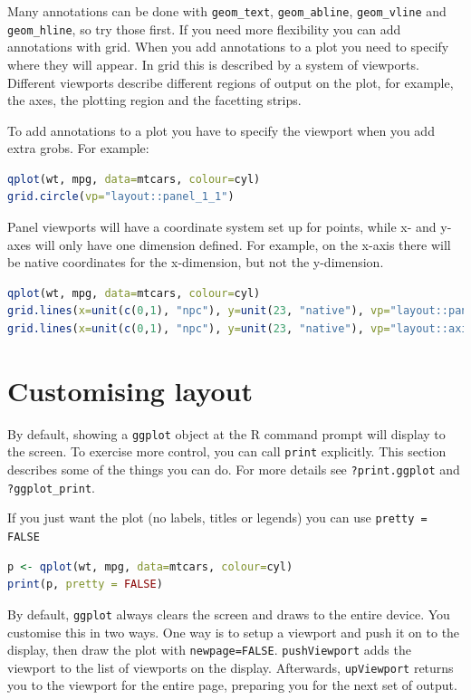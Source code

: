 Many annotations can be done with {\tt geom\_text}, {\tt geom\_abline}, {\tt geom\_vline} and {\tt geom\_hline}, so try those first.  If you need more flexibility you can add annotations with grid.  When you add annotations to a plot you need to specify where they will appear.  In grid this is described by a system of viewports.  Different viewports describe different regions of output on the plot, for example, the axes, the plotting region and the facetting strips.

To add annotations to a plot you have to specify the viewport when you add extra grobs.  For example:

\begin{lstlisting}[language = R]
qplot(wt, mpg, data=mtcars, colour=cyl)
grid.circle(vp="layout::panel_1_1")
\end{lstlisting}

Panel viewports will have a coordinate system set up for points, while x- and y- axes will only have one dimension defined.  For example, on the x-axis there will be native coordinates for the x-dimension, but not the y-dimension.

\begin{lstlisting}[language = R]
qplot(wt, mpg, data=mtcars, colour=cyl)
grid.lines(x=unit(c(0,1), "npc"), y=unit(23, "native"), vp="layout::panel_1_1")
grid.lines(x=unit(c(0,1), "npc"), y=unit(23, "native"), vp="layout::axis_v_1_1")
\end{lstlisting}



\section{Customising layout}
\label{sec:grid-layout}

By default, showing a {\tt ggplot} object at the R command prompt will display to the screen.  To exercise more control, you can call {\tt print} explicitly.  This section describes some of the things you can do.  For more details see {\tt ?print.ggplot} and {\tt ?ggplot\_print}.

If you just want the plot (no labels, titles or legends) you can use {\tt pretty = FALSE}

\begin{lstlisting}[language = R]
p <- qplot(wt, mpg, data=mtcars, colour=cyl)
print(p, pretty = FALSE)
\end{lstlisting}

By default, {\tt ggplot} always clears the screen and draws to the entire device.  You customise this in two ways. One way is to setup a viewport and push it on to the display, then draw the plot with {\tt newpage=FALSE}. {\tt pushViewport} adds the viewport to the list of viewports on the display.   Afterwards, {\tt upViewport} returns you to the viewport for the entire page, preparing you for the next set of output.

